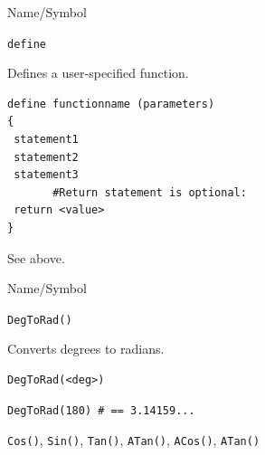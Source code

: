 \vfill
\newpage
{}
\vfill

\begin{desc}{Name/Symbol}
\item[Name/Symbol]  	\verb+define+

\item[Description]  	Defines a user-specified function.

\item[Usage]
\begin{verbatim}
define functionname (parameters)
{
 statement1
 statement2
 statement3
       #Return statement is optional:
 return <value>
}
\end{verbatim}

\item[Example]    	See above.

\item[See Also]
\end{desc}   	



\begin{desc}{Name/Symbol}
\item[Name/Symbol]  	\verb+DegToRad()+

\item[Description]  	Converts degrees to radians.

\item[Usage]
\begin{verbatim}
DegToRad(<deg>)
\end{verbatim}

\item[Example]     	
\begin{verbatim}
DegToRad(180) # == 3.14159...
\end{verbatim}

\item[See Also]    	\verb+Cos()+, \verb+Sin()+, \verb+Tan()+, \verb+ATan()+, \verb+ACos()+, \verb+ATan()+ 
\end{desc}





